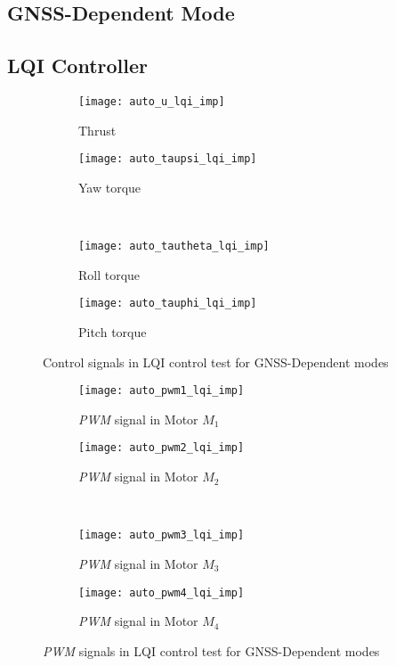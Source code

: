 \begin{appendices}
\section*{GNSS-Dependent Mode}

\subsection*{LQI Controller}

\begin{figure}[H]
\begin{subfigure}{.5\linewidth}
\centering
\texttt{[image: auto\_u\_lqi\_imp]}
\caption{Thrust}
\label{fig:auto_u_lqi_imp}
\end{subfigure}%
\begin{subfigure}{.5\linewidth}
\centering
\texttt{[image: auto\_taupsi\_lqi\_imp]}
\caption{Yaw torque}
\label{fig:auto_taupsi_lqi_imp}
\end{subfigure}\\[1ex]
\begin{subfigure}{0.5\linewidth}
\centering
\texttt{[image: auto\_tautheta\_lqi\_imp]}
\caption{Roll torque}
\label{fig:auto_tautheta_lqi_imp}
\end{subfigure}
\begin{subfigure}{0.5\linewidth}
\centering
\texttt{[image: auto\_tauphi\_lqi\_imp]}
\caption{Pitch torque}
\label{fig:auto_tauphi_h_lqi}
\end{subfigure}
\caption{Control signals in LQI control test for GNSS-Dependent modes}
\label{fig:auto_control_lqi}
\end{figure}

\begin{figure}[H]
\begin{subfigure}{.5\linewidth}
\centering
\texttt{[image: auto\_pwm1\_lqi\_imp]}
\caption{\textit{PWM} signal in Motor $M_1$}
\label{fig:auto_pwm_lqi_imp}
\end{subfigure}%
\begin{subfigure}{.5\linewidth}
\centering
\texttt{[image: auto\_pwm2\_lqi\_imp]}
\caption{\textit{PWM} signal in Motor $M_2$}
\label{fig:auto_pwm2_lqi_imp}
\end{subfigure}\\[1ex]
\begin{subfigure}{0.5\linewidth}
\centering
\texttt{[image: auto\_pwm3\_lqi\_imp]}
\caption{\textit{PWM} signal in Motor $M_3$}
\label{fig:auto_pwm3_lqi_imp}
\end{subfigure}
\begin{subfigure}{0.5\linewidth}
\centering
\texttt{[image: auto\_pwm4\_lqi\_imp]}
\caption{\textit{PWM} signal in Motor $M_4$}
\label{fig:auto_pwm4_lqi_imp}
\end{subfigure}
\caption{\textit{PWM} signals in LQI control test for GNSS-Dependent modes}
\label{fig:auto_pwm_lqi}
\end{figure}




\end{appendices}
